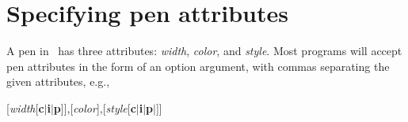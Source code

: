 \section{Specifying pen attributes}

%
%
\label{sec:pen}
A pen in \GMT\ has three attributes: \emph{width}, \emph{color},
and \emph{style}.  Most programs will accept pen attributes in
the form of an option argument, with commas separating the
given attributes, e.g.,

\vspace{\baselineskip}

\par {}[\emph{width}[\textbf{c$|$i$|$p}]],[\emph{color}],[\emph{style}[\textbf{c$|$i$|$p$|$}]]\par

